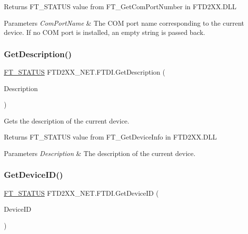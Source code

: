 \begin{DoxyReturn}{Returns}
F\+T\+\_\+\+S\+T\+A\+T\+US value from F\+T\+\_\+\+Get\+Com\+Port\+Number in F\+T\+D2\+X\+X.\+D\+LL
\end{DoxyReturn}

\begin{DoxyParams}{Parameters}
{\em Com\+Port\+Name} & The C\+OM port name corresponding to the current device. If no C\+OM port is installed, an empty string is passed back.\\
\hline
\end{DoxyParams}
\mbox{\label{class_f_t_d2_x_x___n_e_t_1_1_f_t_d_i_a3d23127003a5f51aae88c148ea87c8c5}} 
\subsubsection{\texorpdfstring{GetDescription()}{GetDescription()}}
{\footnotesize\ttfamily \mbox{\hyperlink{class_f_t_d2_x_x___n_e_t_1_1_f_t_d_i_aabe20ad905cc4ccc1e35dd5b877d9a83}{F\+T\+\_\+\+S\+T\+A\+T\+US}} F\+T\+D2\+X\+X\+\_\+\+N\+E\+T.\+F\+T\+D\+I.\+Get\+Description (\begin{DoxyParamCaption}\item[{out string}]{Description }\end{DoxyParamCaption})}



Gets the description of the current device. 

\begin{DoxyReturn}{Returns}
F\+T\+\_\+\+S\+T\+A\+T\+US value from F\+T\+\_\+\+Get\+Device\+Info in F\+T\+D2\+X\+X.\+D\+LL
\end{DoxyReturn}

\begin{DoxyParams}{Parameters}
{\em Description} & The description of the current device.\\
\hline
\end{DoxyParams}
\mbox{\label{class_f_t_d2_x_x___n_e_t_1_1_f_t_d_i_aa7646a14e37818f43d49e6d98a9a3d10}} 
\subsubsection{\texorpdfstring{GetDeviceID()}{GetDeviceID()}}
{\footnotesize\ttfamily \mbox{\hyperlink{class_f_t_d2_x_x___n_e_t_1_1_f_t_d_i_aabe20ad905cc4ccc1e35dd5b877d9a83}{F\+T\+\_\+\+S\+T\+A\+T\+US}} F\+T\+D2\+X\+X\+\_\+\+N\+E\+T.\+F\+T\+D\+I.\+Get\+Device\+ID (\begin{DoxyParamCaption}\item[{ref U\+Int32}]{Device\+ID }\end{DoxyParamCaption})}



